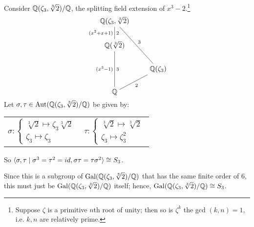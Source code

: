\documentclass[12pt]{article}
\begin{document}
\eg {}Consider $\mathbb{Q}(\zeta_3, \sqrt[3]{2})/\mathbb{Q}$, the splitting field extension of $x^3-2$.\footnote{Suppose $\zeta$ is a primitive $n$th root of unity; then so is $\zeta^k$ \ifnif the gcd $(k,n)=1$, i.e. $k,n$ are relatively prime.} 
\[\begin{tikzcd}[ampersand replacement=\&,cramped]
	{\mathbb{Q}(\zeta_3,\sqrt[3]2)} \\
	{\mathbb{Q}(\sqrt[3]2)} \\
	\& {\mathbb Q(\zeta_3)} \\
	{\mathbb Q}
	\arrow["2", no head, from=1-1, to=2-1]
	\arrow["3", no head, from=2-1, to=4-1]
	\arrow["3", no head, from=1-1, to=3-2]
	\arrow["2"', no head, from=4-1, to=3-2]
	\arrow["{(x^3-1)}"', draw=none, from=2-1, to=4-1]
	\arrow["{(x^2+x+1)}"', draw=none, from=1-1, to=2-1]
\end{tikzcd}\]
Let $\sigma,\tau \in \operatorname{Aut}(\mathbb{Q}(\zeta_3,\sqrt[3]2)/\mathbb{Q})$ be given by:
\begin{center}
    \begin{tabular}[t]{ll}
        $\sigma: \left\{ \begin{array}{cl}
            \sqrt[3]2 \mapsto \zeta_3 \sqrt[3]2\\
                    \zeta_3 \mapsto \zeta_3
            \end{array} \right.$ 
            & $\tau: \left\{ \begin{array}{cl}
                \sqrt[3]2 \mapsto \sqrt[3]2\\
                        \zeta_3 \mapsto \zeta_3^2
                \end{array} \right.$
    \end{tabular}
\end{center}
So $\langle \sigma,\tau\mid \sigma^3=\tau^2=id, \sigma\tau=\tau\sigma^2 \rangle\cong S_3$. 

Since this is a subgroup of $\operatorname{Gal}(\mathbb{Q}(\zeta_3,\sqrt[3]2)/\mathbb{Q})$ that has the same finite order of 6, this must just be $\operatorname{Gal}(\mathbb{Q}(\zeta_3,\sqrt[3]2)/\mathbb{Q})$ itself; hence, $\operatorname{Gal}(\mathbb{Q}(\zeta_3,\sqrt[3]2)/\mathbb{Q})\cong S_3$.
\end{document}
